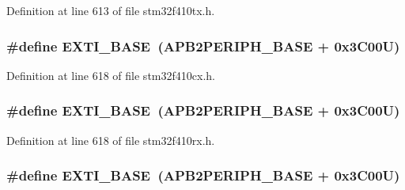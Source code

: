 Definition at line 613 of file stm32f410tx.\+h.

\subsubsection[{\texorpdfstring{E\+X\+T\+I\+\_\+\+B\+A\+SE}{EXTI_BASE}}]{\setlength{\rightskip}{0pt plus 5cm}\#define E\+X\+T\+I\+\_\+\+B\+A\+SE~({\bf A\+P\+B2\+P\+E\+R\+I\+P\+H\+\_\+\+B\+A\+SE} + 0x3\+C00\+U)}\hypertarget{group___peripheral__registers__structures_ga87371508b3bcdcd98cd1ec629be29061}{}\label{group___peripheral__registers__structures_ga87371508b3bcdcd98cd1ec629be29061}


Definition at line 618 of file stm32f410cx.\+h.

\subsubsection[{\texorpdfstring{E\+X\+T\+I\+\_\+\+B\+A\+SE}{EXTI_BASE}}]{\setlength{\rightskip}{0pt plus 5cm}\#define E\+X\+T\+I\+\_\+\+B\+A\+SE~({\bf A\+P\+B2\+P\+E\+R\+I\+P\+H\+\_\+\+B\+A\+SE} + 0x3\+C00\+U)}\hypertarget{group___peripheral__registers__structures_ga87371508b3bcdcd98cd1ec629be29061}{}\label{group___peripheral__registers__structures_ga87371508b3bcdcd98cd1ec629be29061}


Definition at line 618 of file stm32f410rx.\+h.

\subsubsection[{\texorpdfstring{E\+X\+T\+I\+\_\+\+B\+A\+SE}{EXTI_BASE}}]{\setlength{\rightskip}{0pt plus 5cm}\#define E\+X\+T\+I\+\_\+\+B\+A\+SE~({\bf A\+P\+B2\+P\+E\+R\+I\+P\+H\+\_\+\+B\+A\+SE} + 0x3\+C00\+U)}\hypertarget{group___peripheral__registers__structures_ga87371508b3bcdcd98cd1ec629be29061}{}\label{group___peripheral__registers__structures_ga87371508b3bcdcd98cd1ec629be29061}


